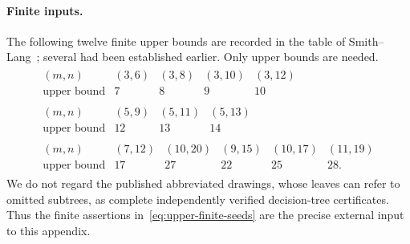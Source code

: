 \documentclass[11pt]{article}
\theoremstyle{definition}
\theoremstyle{remark}
\begin{document}
\paragraph{Finite inputs.}
The following twelve finite upper bounds are recorded in the table of
Smith--Lang~\cite{smithlang}; several had been established earlier.
Only upper bounds are needed.
\begin{equation}\label{eq:upper-finite-seeds}
\begin{gathered}
\begin{array}{c|rrrr}
 (m,n)&(3,6)&(3,8)&(3,10)&(3,12)\\ \hline
 \text{upper bound}&7&8&9&10
\end{array}
\\[6pt]
\begin{array}{c|rrr}
 (m,n)&(5,9)&(5,11)&(5,13)\\ \hline
\text{upper bound}&12&13&14
\end{array}
\\[6pt]
\begin{array}{c|rrrrr}
 (m,n)&(7,12)&(10,20)&(9,15)&(10,17)&(11,19)\\ \hline
\text{upper bound}&17&27&22&25&28.
\end{array}
\end{gathered}
\end{equation}
We do not regard the published abbreviated drawings, whose leaves can refer
to omitted subtrees, as complete independently verified decision-tree
certificates.  Thus the finite assertions in~\eqref{eq:upper-finite-seeds}
are the precise external input to this appendix.
\end{document}
